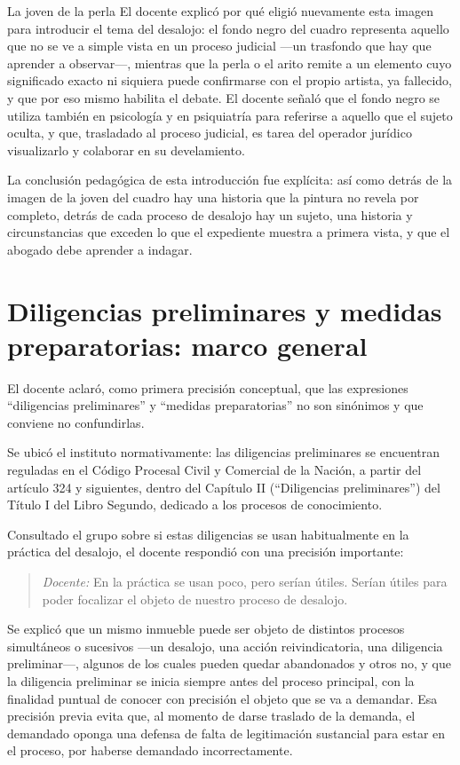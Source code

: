 \documentclass[12pt,oneside]{book}
\begin{document}
\begin{example}{La joven de la perla}
El docente explicó por qué eligió nuevamente esta imagen para introducir el tema del desalojo: el fondo negro del cuadro representa aquello que no se ve a simple vista en un proceso judicial —un trasfondo que hay que aprender a observar—, mientras que la perla o el arito remite a un elemento cuyo significado exacto ni siquiera puede confirmarse con el propio artista, ya fallecido, y que por eso mismo habilita el debate. El docente señaló que el fondo negro se utiliza también en psicología y en psiquiatría para referirse a aquello que el sujeto oculta, y que, trasladado al proceso judicial, es tarea del operador jurídico visualizarlo y colaborar en su develamiento.
\end{example}

La conclusión pedagógica de esta introducción fue explícita: así como detrás de la imagen de la joven del cuadro hay una historia que la pintura no revela por completo, detrás de cada proceso de desalojo hay un sujeto, una historia y circunstancias que exceden lo que el expediente muestra a primera vista, y que el abogado debe aprender a indagar.

\section{Diligencias preliminares y medidas preparatorias: marco general}

El docente aclaró, como primera precisión conceptual, que las expresiones ``diligencias preliminares'' y ``medidas preparatorias'' no son sinónimos y que conviene no confundirlas.

Se ubicó el instituto normativamente: las diligencias preliminares se encuentran reguladas en el Código Procesal Civil y Comercial de la Nación, a partir del artículo 324 y siguientes, dentro del Capítulo II (``Diligencias preliminares'') del Título I del Libro Segundo, dedicado a los procesos de conocimiento.

Consultado el grupo sobre si estas diligencias se usan habitualmente en la práctica del desalojo, el docente respondió con una precisión importante:

\begin{quote}
\textit{Docente:} En la práctica se usan poco, pero serían útiles. Serían útiles para poder focalizar el objeto de nuestro proceso de desalojo.
\end{quote}

Se explicó que un mismo inmueble puede ser objeto de distintos procesos simultáneos o sucesivos —un desalojo, una acción reivindicatoria, una diligencia preliminar—, algunos de los cuales pueden quedar abandonados y otros no, y que la diligencia preliminar se inicia siempre antes del proceso principal, con la finalidad puntual de conocer con precisión el objeto que se va a demandar. Esa precisión previa evita que, al momento de darse traslado de la demanda, el demandado oponga una defensa de falta de legitimación sustancial para estar en el proceso, por haberse demandado incorrectamente.
\end{document}

